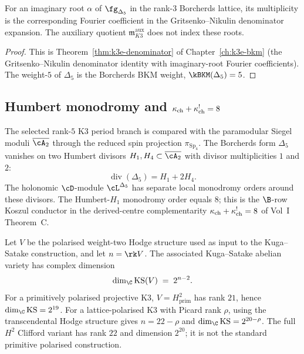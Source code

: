 \begin{corollary}
\label{gluing:cor:imaginary-seeded}
For an imaginary root \(\alpha\) of \(\fg_{\Delta_5}\) in the
rank-\(3\) Borcherds lattice, its multiplicity is the corresponding
Fourier coefficient in the Gritsenko--Nikulin denominator expansion.
The auxiliary quotient \(\mathfrak m_{K3}^{\mathrm{aux}}\) does not
index these roots.
\end{corollary}

\begin{proof}
This is Theorem~\ref{thm:k3e-denominator} of
Chapter~\ref{ch:k3e-bkm} (the Gritsenko--Nikulin denominator identity
with imaginary-root Fourier coefficients). The weight-$5$ of
$\Delta_5$ is the Borcherds BKM weight, $\kBKM(\Delta_5) = 5$.
\end{proof}

\subsection{Humbert monodromy and $\kappa_{\mathrm{ch}} + \kappa_{\mathrm{ch}}^! = 8$}
\label{gluing:sec:k3xe-humbert}

The selected rank-\(5\) K3 period branch is compared with the
paramodular Siegel moduli \(\overline{\cA_2}\) through the reduced spin
projection \(\pi_{\mathrm{Sp}_4}\). The Borcherds form
$\Delta_5$ vanishes on two Humbert divisors $H_1, H_4 \subset
\overline{\cA_2}$ with divisor multiplicities $1$ and $2$:
\[
\operatorname{div}(\Delta_5)=H_1+2H_4.
\]
The holonomic $\cD$-module $\cL^{\Delta_5}$ has separate local
monodromy orders around these divisors. The Humbert-$H_1$ monodromy
order equals $8$; this is the $\B$-row Koszul conductor in the
derived-centre complementarity $\kappa_{\mathrm{ch}}+\kappa_{\mathrm{ch}}^!=8$ of Vol~I Theorem~C.

\begin{proposition}
\label{gluing:prop:kuga-satake-dimension}
Let $V$ be the polarised weight-two Hodge structure used as input to
the Kuga--Satake construction, and let $n=\rk V$. The associated
Kuga--Satake abelian variety has complex dimension
\[
 \dim_\C \mathrm{KS}(V) \;=\; 2^{n - 2}.
\]
For a primitively polarised projective K3, $V=H^2_{\mathrm{prim}}$
has rank $21$, hence $\dim_\C\mathrm{KS}=2^{19}$. For a
lattice-polarised K3 with Picard rank $\rho$, using the
transcendental Hodge structure gives $n=22-\rho$ and
$\dim_\C\mathrm{KS}=2^{20-\rho}$. The full $H^2$ Clifford variant has
rank $22$ and dimension $2^{20}$; it is not the standard primitive
polarised construction.
\end{proposition}

